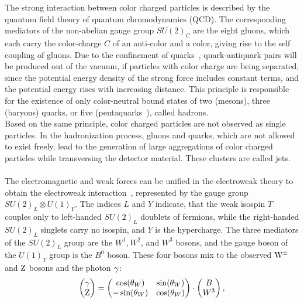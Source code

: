 The strong interaction between color charged particles is described by the quantum field theory of quantum chromodynamics (QCD). The corresponding mediators of the non-abelian gauge group $SU(2)_C$ are the eight gluons, which each carry the color-charge $C$ of an anti-color and a color, giving rise to the self coupling of gluons. Due to the confinement of quarks~\cite{Confinement}, quark-antiquark pairs will be produced out of the vacuum, if particles with color charge are being separated, since the potential energy density of the strong force includes constant terms, and the potential energy rises with increasing distance. This principle is responsible for the existence of only color-neutral bound states of two (mesons), three (baryons) quarks, or five (pentaquarks~\cite{Pentaquarks}), called hadrons.\\
Based on the same principle, color charged particles are not observed as single particles. In the hadronization process, gluons and quarks, which are not allowed to exist freely, lead to the generation of large aggregations of color charged particles while transversing the detector material. These clusters are called jets.
\\\\
The electromagnetic and weak forces can be unified in the electroweak theory to obtain the electroweak interaction~\cite{Weinberg,Weinberg2,Salam,Glashow}, represented by the gauge group $ SU(2)_L\otimes U(1)_Y$. The indices $L$ and $Y$ indicate, that the weak isospin $T$ couples only to left-handed $SU(2)_L$ doublets of fermions, while the right-handed $SU(2)_L$ singlets carry no isospin, and $Y$ is the hypercharge. The three mediators of the $SU(2)_L$ group are the $W^1,W^2$, and $W^3$ bosons, and the gauge boson of the $U(1)_Y$ group is the $B^0$ boson.
These four bosons mix to the observed $\mathrm{W}^\pm$ and $\mathrm{Z}$ bosons and the photon $\gamma$:
\begin{equation}
 \left(
 \begin{matrix}
  \gamma \\
  \mathrm{Z}
 \end{matrix}
 \right)
 =
 \left(\begin{matrix}
  \cos(\theta_W)  & \sin(\theta_W) \\
  -\sin(\theta_W) & \cos(\theta_W) 
 \end{matrix}\right)
 \cdot
 \left(
 \begin{matrix}
  B \\
  W^3
 \end{matrix}
 \right),
\end{equation}

